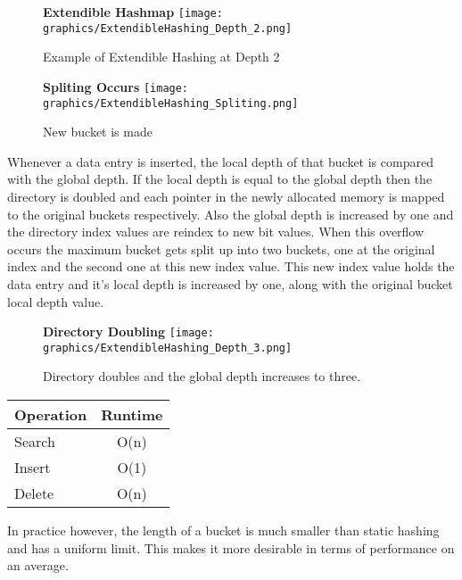 \documentclass[letterpaper, 12pt]{article}
\begin{document}
\begin{figure}
  \centering
  \textbf{Extendible Hashmap}
  \texttt{[image: graphics/ExtendibleHashing\_Depth\_2.png]}
  \cite{ramakrishnan2000database}
  \caption{Example of Extendible Hashing at Depth 2}
\end{figure}

\begin{figure}
  \centering
  \textbf{Spliting Occurs}
  \texttt{[image: graphics/ExtendibleHashing\_Spliting.png]}
  \cite{ramakrishnan2000database}
  \caption{New bucket is made}
\end{figure}


Whenever a data entry is inserted, the local depth of that bucket is compared with the global depth. If the local depth
is equal to the global depth then the directory is doubled and each pointer in the newly allocated memory is mapped to the
original buckets respectively. Also the global depth is increased by one and the directory index values are reindex to new
bit values. When this overflow occurs the maximum bucket gets split up into two buckets, one at the original index and the
second one at this new index value. This new index value holds the data entry and it's local depth is increased by one, along with
the original bucket local depth value.

\begin{figure}
  \textbf{Directory Doubling}
  \texttt{[image: graphics/ExtendibleHashing\_Depth\_3.png]}
  \cite{ramakrishnan2000database}
  \caption{Directory doubles and the global depth increases to three.}
\end{figure}

\begin{center}
\begin{tabular}{l | c }
  \hline
  Operation & Runtime \\ \hline \hline
  Search & O(n) \\ \hline
  Insert & O(1) \\ \hline
  Delete & O(n) \\ \hline
\end{tabular}
\end{center}

In practice however, the length of a bucket is much smaller than static hashing and has
a uniform limit. This makes it more desirable in terms of performance on an average.

\end{document}
